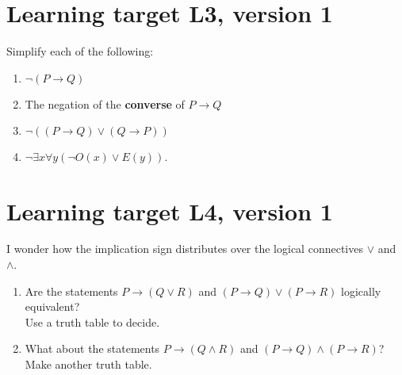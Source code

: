 \pagebreak
\section{Learning target L3, version 1}

Simplify each of the following:

\begin{enumerate}
    \item $\lnot(P\to Q)$ \vfill
    \item The negation of the \textbf{converse} of $P\to Q$\vfill
    \item $\lnot((P\to Q) \lor (Q\to P))$\vfill
    \item $\neg \exists x \forall y (\neg O(x) \vee E(y))\text{.}$\vfill
\end{enumerate}

\pagebreak
\section{Learning target L4, version 1}

I wonder how the implication sign distributes over the logical connectives $\lor$ and $\land$.

\begin{enumerate}
    \item Are the statements $P \to (Q\lor R)$ and $(P\to Q) \lor (P \to R)$ logically equivalent? \\
    Use a truth table to decide.
    \vfill
    \item What about the statements $P \to (Q\land R)$ and $(P\to Q) \land (P \to R)$? Make another truth table.
    \vfill
\end{enumerate}

